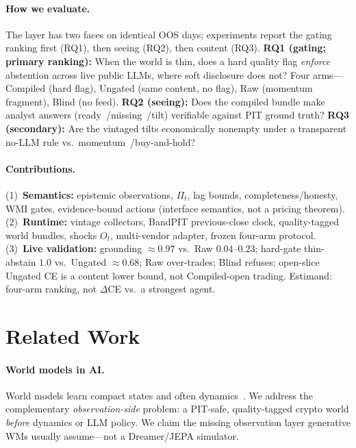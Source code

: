 \documentclass[sigconf,anonymous]{acmart}
\theoremstyle{acmdefinition}%
\theoremstyle{acmplain}%
\begin{document}
\paragraph{How we evaluate.}
The layer has two faces on identical OOS days; experiments report the gating ranking first (RQ1), then seeing (RQ2), then content (RQ3).
\textbf{RQ1 (gating; primary ranking):} When the world is thin, does a hard quality flag \emph{enforce} abstention across live public LLMs, where soft disclosure does not?
Four arms---Compiled (hard flag), Ungated (same content, no flag), Raw (momentum fragment), Blind (no feed).
\textbf{RQ2 (seeing):} Does the compiled bundle make analyst answers (ready~/missing~/tilt) verifiable against PIT ground truth?
\textbf{RQ3 (secondary):} Are the vintaged tilts economically nonempty under a transparent no-LLM rule vs.\ momentum~/buy-and-hold?

\paragraph{Contributions.}
(1)~\textbf{Semantics:} epistemic observations, \(\Pi_t\), lag bounds, completeness/honesty, WMI gates, evidence-bound actions (interface semantics, not a pricing theorem).
(2)~\textbf{Runtime:} vintage collectors, BandPIT previous-close clock, quality-tagged world bundles, shocks \(O_t\), multi-vendor adapter, frozen four-arm protocol.
(3)~\textbf{Live validation:} grounding \({\approx}0.97\) vs.\ Raw \(0.04\)--\(0.23\); hard-gate thin-abstain \(1.0\) vs.\ Ungated \({\approx}0.68\); Raw over-trades; Blind refuses; open-slice Ungated CE is a content lower bound, not Compiled-open trading. Estimand: four-arm ranking, not \(\Delta\)CE vs.\ a strongest agent.

\section{Related Work}
\label{sec:related}

\paragraph{World models in AI.}
World models learn compact states and often dynamics~\cite{ha2018world,hafner2020dreamer,lecun2022path}. We address the complementary \emph{observation-side} problem: a PIT-safe, quality-tagged crypto world \emph{before} dynamics or LLM policy. We claim the missing observation layer generative WMs usually assume---not a Dreamer/JEPA simulator.
\end{document}
